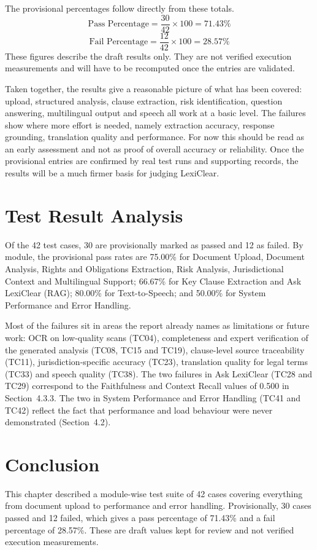 \documentclass[12pt,a4paper,oneside]{report}
\begin{document}
The provisional percentages follow directly from these totals.
\begin{equation}
\text{Pass Percentage} = \frac{30}{42}\times 100 = 71.43\%
\end{equation}
\begin{equation}
\text{Fail Percentage} = \frac{12}{42}\times 100 = 28.57\%
\end{equation}
These figures describe the draft results only. They are not verified execution measurements and will have to be recomputed once the entries are validated.

Taken together, the results give a reasonable picture of what has been covered: upload, structured analysis, clause extraction, risk identification, question answering, multilingual output and speech all work at a basic level. The failures show where more effort is needed, namely extraction accuracy, response grounding, translation quality and performance. For now this should be read as an early assessment and not as proof of overall accuracy or reliability. Once the provisional entries are confirmed by real test runs and supporting records, the results will be a much firmer basis for judging LexiClear.

\section{Test Result Analysis}
Of the 42 test cases, 30 are provisionally marked as passed and 12 as failed. By module, the provisional pass rates are 75.00\% for Document Upload, Document Analysis, Rights and Obligations Extraction, Risk Analysis, Jurisdictional Context and Multilingual Support; 66.67\% for Key Clause Extraction and Ask LexiClear (RAG); 80.00\% for Text-to-Speech; and 50.00\% for System Performance and Error Handling.

Most of the failures sit in areas the report already names as limitations or future work: OCR on low-quality scans (TC04), completeness and expert verification of the generated analysis (TC08, TC15 and TC19), clause-level source traceability (TC11), jurisdiction-specific accuracy (TC23), translation quality for legal terms (TC33) and speech quality (TC38). The two failures in Ask LexiClear (TC28 and TC29) correspond to the Faithfulness and Context Recall values of 0.500 in Section~4.3.3. The two in System Performance and Error Handling (TC41 and TC42) reflect the fact that performance and load behaviour were never demonstrated (Section~4.2).

\section{Conclusion}
This chapter described a module-wise test suite of 42 cases covering everything from document upload to performance and error handling. Provisionally, 30 cases passed and 12 failed, which gives a pass percentage of 71.43\% and a fail percentage of 28.57\%. These are draft values kept for review and not verified execution measurements.
\end{document}
